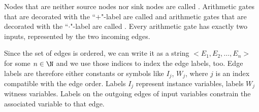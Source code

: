 Nodes that are neither source nodes nor sink nodes are called . Arithmetic gates that are decorated with the ``$+$"-label are called  and arithmetic gates that are decorated with the ``$\cdot$"-label are called . Every arithmetic gate has exactly two inputs, represented by the two incoming edges.

Since the set of edges is ordered, we can write it as a string $<E_1,E_2,\ldots, E_n>$ for some $n\in \N$ and we use those indices to index the edge labels, too. Edge labels are therefore either constants or symbols like $I_j$, $W_j$, where $j$ is an index compatible with the edge order. Labels $I_j$ represent instance variables, labels $W_j$ witness variables. Labels on the outgoing edges of input variables constrain the associated variable to that edge. 

